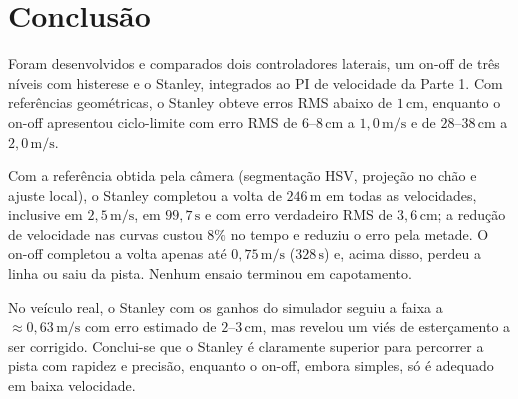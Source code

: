\section{Conclusão}\label{sec:conclusao}

Foram desenvolvidos e comparados dois controladores laterais, um on-off de três níveis com histerese e o Stanley, integrados ao PI de velocidade da Parte 1. Com referências geométricas, o Stanley obteve erros RMS abaixo de $1\,\mathrm{cm}$, enquanto o on-off apresentou ciclo-limite com erro RMS de $6$--$8\,\mathrm{cm}$ a $1{,}0\,\mathrm{m/s}$ e de $28$--$38\,\mathrm{cm}$ a $2{,}0\,\mathrm{m/s}$.

Com a referência obtida pela câmera (segmentação HSV, projeção no chão e ajuste local), o Stanley completou a volta de $246\,\mathrm{m}$ em todas as velocidades, inclusive em $2{,}5\,\mathrm{m/s}$, em $99{,}7\,\mathrm{s}$ e com erro verdadeiro RMS de $3{,}6\,\mathrm{cm}$; a redução de velocidade nas curvas custou $8\%$ no tempo e reduziu o erro pela metade. O on-off completou a volta apenas até $0{,}75\,\mathrm{m/s}$ ($328\,\mathrm{s}$) e, acima disso, perdeu a linha ou saiu da pista. Nenhum ensaio terminou em capotamento.

No veículo real, o Stanley com os ganhos do simulador seguiu a faixa a $\approx0{,}63\,\mathrm{m/s}$ com erro estimado de $2$--$3\,\mathrm{cm}$, mas revelou um viés de esterçamento a ser corrigido. Conclui-se que o Stanley é claramente superior para percorrer a pista com rapidez e precisão, enquanto o on-off, embora simples, só é adequado em baixa velocidade.
